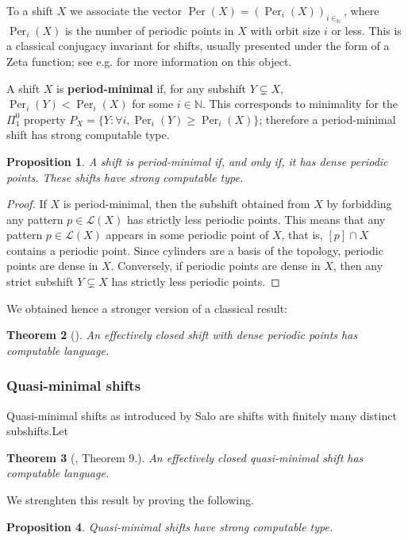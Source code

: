 \documentclass[french,american]{article}
\theoremstyle{plain}
\newtheorem{theorem}{Theorem}[section]
\newtheorem{proposition}[theorem]{Proposition}
\theoremstyle{definition}
\theoremstyle{remark}
\theoremstyle{plain}
\newcommand{\N}{\mathbb{N}}
\renewcommand{\L}{\mathcal L}
\DeclareMathOperator{\Per}{Per}
\begin{document}
To a shift $X$ we associate the vector $\Per(X)=(\Per_{i}(X))_{i\in_{\N}}$,
where $\Per_{i}(X)$ is the number of periodic points in $X$ with orbit
size $i$ or less. This is a classical conjugacy invariant for shifts,
usually presented under the form of a Zeta function; see e.g. \cite{lind1996zeta}
for more information on this object.

A shift $X$ is \textbf{period-minimal} if, for any subshift $Y\subsetneq X$,
$\Per_{i}(Y)<\Per_{i}(X)$ for some $i\in\N$. This corresponds to
minimality for the $\Pi_{1}^{0}$ property $P_{X}=\{Y:\forall i,\Per_{i}(Y)\geq\Per_{i}(X)\}$;
therefore a period-minimal shift has strong computable type.
\begin{proposition}
A shift is period-minimal if, and only if, it has dense periodic points.
These shifts have strong computable type. 
\end{proposition}

\begin{proof}
If $X$ is period-minimal, then the subshift obtained from $X$ by forbidding any pattern $p\in \L(X)$ has strictly less periodic points.
This means that any pattern $p \in \mathcal L(X)$ appears in some periodic point of $X$, that is, $[p]\cap X$ contains a periodic point.
Since cylinders are a basis of the topology, periodic points are dense in $X$. Conversely, if periodic points are dense in $X$,
then any strict subshift $Y\subsetneq X$ has strictly less periodic points.
\end{proof}
We obtained hence a stronger version of a classical result:
\begin{theorem}[\cite{kitchens2006periodic}]
\label{thm:periodic} An effectively closed shift with dense periodic points
has computable language.
\end{theorem}


\subsubsection{Quasi-minimal shifts}\label{sec:quasiminimal}

Quasi-minimal shifts as introduced by Salo \cite{salo2017decidability} are shifts with finitely many distinct subshifts.Let
\begin{theorem}[\cite{salo2017decidability}, Theorem 9.]
\label{thm:quasiminimal} An effectively closed quasi-minimal shift has computable
language.
\end{theorem}

We strenghten this result by proving the following.
\begin{proposition}
Quasi-minimal shifts have strong computable type.
\end{proposition}
\end{document}
